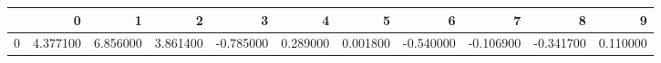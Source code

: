 \begin{tabular}{lrrrrrrrrrr}
\toprule
 & 0 & 1 & 2 & 3 & 4 & 5 & 6 & 7 & 8 & 9 \\
\midrule
0 & 4.377100 & 6.856000 & 3.861400 & -0.785000 & 0.289000 & 0.001800 & -0.540000 & -0.106900 & -0.341700 & 0.110000 \\
\bottomrule
\end{tabular}
